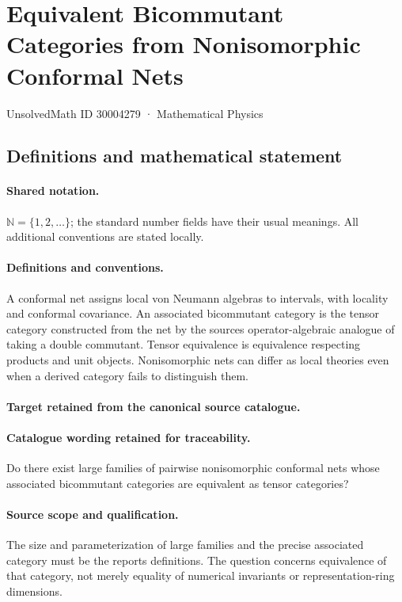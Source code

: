 \documentclass[11pt]{article}
\begin{document}
\setcounter{section}{30004278}
\section{Equivalent Bicommutant Categories from Nonisomorphic Conformal Nets}\label{30004279}
{\small UnsolvedMath ID 30004279 · Mathematical Physics}
\subsection{Definitions and mathematical statement}

\paragraph{Shared notation.}$\mathbb N=\{1,2,\ldots\}$; the standard number fields have their usual meanings. All additional conventions are stated locally.


\paragraph{Definitions and conventions.}
A conformal net assigns local von Neumann algebras to intervals, with locality and conformal covariance. An associated bicommutant category is the tensor category constructed from the net by the source\textquotesingle s operator-algebraic analogue of taking a double commutant. Tensor equivalence is equivalence respecting products and unit objects. Nonisomorphic nets can differ as local theories even when a derived category fails to distinguish them.

\paragraph{Target retained from the canonical source catalogue.}
\paragraph{Catalogue wording retained for traceability.}
Do there exist large families of pairwise nonisomorphic conformal nets whose associated bicommutant categories are equivalent as tensor categories?

\paragraph{Source scope and qualification.}
The size and parameterization of large families and the precise associated category must be the report\textquotesingle s definitions. The question concerns equivalence of that category, not merely equality of numerical invariants or representation-ring dimensions.
\end{document}
